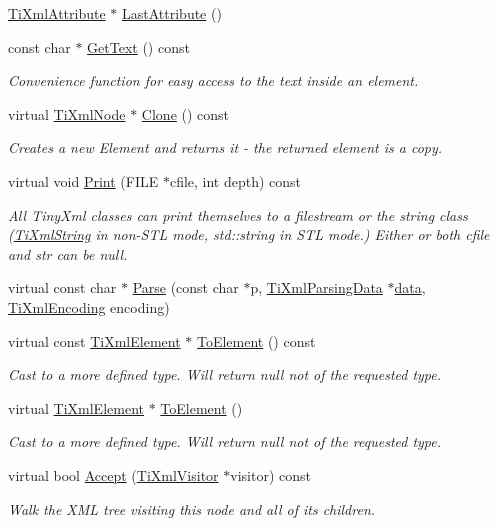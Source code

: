 \begin{DoxyCompactItemize}
\hyperlink{class_ti_xml_attribute}{TiXmlAttribute} $\ast$ \hyperlink{class_ti_xml_element_a222f81cf06155cd108f2a68d4d176004}{LastAttribute} ()
\item 
const char $\ast$ \hyperlink{class_ti_xml_element_aa6dedd8a146acf3b1bc0903deb2d411a}{GetText} () const 
\begin{DoxyCompactList}\small\item\em Convenience function for easy access to the text inside an element. \end{DoxyCompactList}\item 
virtual \hyperlink{class_ti_xml_node}{TiXmlNode} $\ast$ \hyperlink{class_ti_xml_element_a13f6df105ebb1e8dc636e75cc883be32}{Clone} () const 
\begin{DoxyCompactList}\small\item\em Creates a new Element and returns it -\/ the returned element is a copy. \end{DoxyCompactList}\item 
virtual void \hyperlink{class_ti_xml_element_ad9d0c008866982ab8d9aafae7e14d692}{Print} (FILE $\ast$cfile, int depth) const 
\begin{DoxyCompactList}\small\item\em All TinyXml classes can print themselves to a filestream or the string class (\hyperlink{class_ti_xml_string}{TiXmlString} in non-\/STL mode, std::string in STL mode.) Either or both cfile and str can be null. \end{DoxyCompactList}\item 
virtual const char $\ast$ \hyperlink{class_ti_xml_element_af95c9165159fd9dfdcc5b894a3fcf85b}{Parse} (const char $\ast$p, \hyperlink{class_ti_xml_parsing_data}{TiXmlParsingData} $\ast$\hyperlink{bootstrap_8cc_a923b2158227405b9f7a6eceb6c7104c8}{data}, \hyperlink{tinyxml_8h_a88d51847a13ee0f4b4d320d03d2c4d96}{TiXmlEncoding} encoding)
\item 
virtual const \hyperlink{class_ti_xml_element}{TiXmlElement} $\ast$ \hyperlink{class_ti_xml_element_ac5b8d0e25fa23fd9acbb6d146082901c}{ToElement} () const 
\begin{DoxyCompactList}\small\item\em Cast to a more defined type. Will return null not of the requested type. \end{DoxyCompactList}\item 
virtual \hyperlink{class_ti_xml_element}{TiXmlElement} $\ast$ \hyperlink{class_ti_xml_element_a9def86337ea7a755eb41cac980f60c7a}{ToElement} ()
\begin{DoxyCompactList}\small\item\em Cast to a more defined type. Will return null not of the requested type. \end{DoxyCompactList}\item 
virtual bool \hyperlink{class_ti_xml_element_a31ab28cc3b892a69254391d6bbe08df3}{Accept} (\hyperlink{class_ti_xml_visitor}{TiXmlVisitor} $\ast$visitor) const 
\begin{DoxyCompactList}\small\item\em Walk the XML tree visiting this node and all of its children. \end{DoxyCompactList}\end{DoxyCompactItemize}
